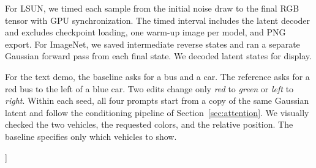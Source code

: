 {\noindent
\begin{minipage}[t]{.48\textwidth}
\vspace{0pt}
For LSUN, we timed each sample from the initial noise draw to the final
RGB tensor with GPU synchronization. The timed interval includes the
latent decoder and excludes checkpoint loading, one warm-up image per
model, and PNG export. For ImageNet, we saved intermediate reverse
states and ran a separate Gaussian forward pass from each final state.
We decoded latent states for display.
\end{minipage}\hfill
\begin{minipage}[t]{.48\textwidth}
\vspace{0pt}
For the text demo, the baseline asks for a bus and a car. The reference
asks for a red bus to the left of a blue car. Two edits change only
\emph{red} to \emph{green} or \emph{left} to \emph{right}. Within each
seed, all four prompts start from a copy of the same Gaussian latent
and follow the conditioning pipeline of Section~\ref{sec:attention}.
We visually checked the two vehicles, the requested colors, and the
relative position. The baseline specifies only which vehicles to show.
\end{minipage}
}]

\onecolumn

